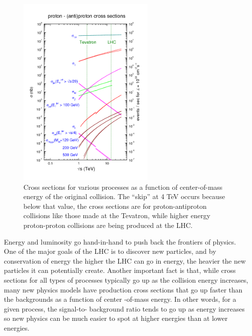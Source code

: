 \begin{figure}
	\centering
	\includegraphics[width=0.6\textwidth]{ATLASDetector/images/crosssections2008.png}
	\caption{Cross sections for various processes as a function of center-of-mass energy
            of the original collision.  The ``skip'' at 4 TeV occurs because below that
            value, the cross sections are for proton-antiproton collisions like those
            made at the Tevatron, while higher energy proton-proton collisions are being produced
            at the LHC. \label{fig:cross_sections}}
\end{figure}


Energy and luminosity go hand-in-hand to push back the frontiers of physics.  One of the 
major goals of the LHC is to discover new particles, and by conservation of energy the higher the LHC 
can go in energy, the heavier the new particles it can potentially create.  Another important fact 
is that, while cross sections for all types of processes typically go up as the collision energy increases, 
many new physics models have production cross sections that go up faster than the backgrounds as a function of center
-of-mass energy.  In other words, for a given process, the signal-to-
background ratio tends to go up as energy increases so new physics can be much easier to spot at higher 
energies than at lower energies.   

